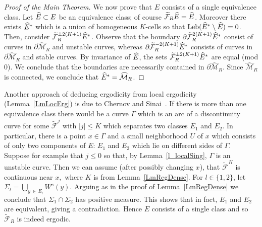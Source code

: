 \documentclass[AHL, Unicode, longabstracts,published]{cedram}
\newcommand{\csp}{\mathcal{M}}
\newcommand{\cspi}{\widehat{\csp}}
\newcommand{\tcF}{\widetilde{\mathcal{F}}}
\newcommand{\Leb}{\textup{Leb}}
\let\oldhat\hat
\renewcommand*{\hat}[1]{\mathchoice{\widehat{#1}}{\widehat{#1}}{\oldhat{#1}}{\oldhat{#1}}}
\begin{document}
\begin{proof}[Proof of the Main Theorem]
We now prove that $E$ consists of a single equivalence class. Let $\hat E\subset E$ be an equivalence class; of course $\tcF_{R}\hat E = \hat E$. Moreover there exists $\hat E^{*}$ which is a union of homogeneous $K$-cells so that $\Leb(\hat E^{*}\setminus \hat E) = 0$. Then, consider $\tcF_{R}^{\pm 2(K+1)}\hat E^{*}$. Observe that the boundary $\partial\tcF_{R}^{2(K+1)}\hat E^{*}$ consist of curves in $\partial\cspi_{R}$ and unstable curves, whereas $\partial\tcF_{R}^{-2(K+1)}\hat E^{*}$ consists of curves in $\partial\cspi_{R}$ and stable curves. By invariance of $\hat E$, the sets $\tcF_{R}^{\pm 2(K+1)}\hat E^{*}$ are equal (mod 0). We conclude that the boundaries are necessarily contained in $\partial\cspi_{R}$. Since $\cspi_{R}$ is connected, we conclude that $\hat E^{*} = \cspi_{R}$.
\end{proof}

\begin{rema}
Another approach of deducing ergodicity from local ergodicity (Lemma~\ref{LmLocErg}) is due to Chernov and Sinai~\cite{SC}. If there is more than one equivalence class there would be a curve $\Gamma$ which is an arc of a discontinuity curve for some $\tcF^j$ with $|j|\leq K$ which separates two classes $E_1$ and $E_2$. In particular, there is a point $x\in\Gamma$ and a small neighborhood $U$ of $x$ which consists of only two components of $E$: $E_1$ and $E_2$ which lie on different sides of $\Gamma$. Suppose for example that $j\leq 0$ so that, by Lemma~\ref{l_localSing}, $\Gamma$ is an unstable curve. Then we can assume (after possibly changing $x$), that $\tcF^K$ is continuous near $x,$ where $K$ is from Lemma~\ref{LmRegDense}. For $l\in\{1,2\}$, let $\Sigma_l=\bigcup_{y\,\in\,E_l} W^s(y).$ Arguing as in the proof of Lemma~\ref{LmRegDense} we conclude that $\Sigma_1\cap \Sigma_2$ has positive measure. This shows that in fact, $E_1$ and $E_2$ are equivalent, giving a contradiction. Hence $E$ consists of a single class and so $\tcF_R$ is indeed ergodic.
\end{rema}
\end{document}

